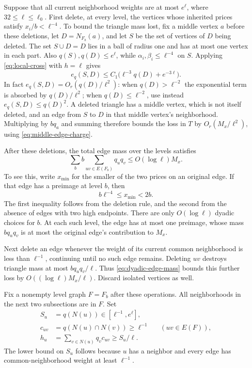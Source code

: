 Suppose that all current neighborhood weights are at most $e^\ell$, where
$32\le\ell\le\ell_0$.  First delete, at every level, the vertices whose
inherited prices satisfy $x_i/b<\ell^{-4}$.  To bound the triangle mass
lost, fix a middle vertex $a$ before these deletions, let
$D=N_{F_b}(a)$, and let $S$ be the set of vertices of $D$ being deleted.
The set $S\cup D=D$ lies in a ball of radius one and has at most one vertex
in each part.  Also $q(S),q(D)\le e^\ell$, while
$\alpha_i,\beta_i\le\ell^{-4}$ on $S$.  Applying
\eqref{eq:local-cross} with $h=\ell$ gives
\[
 e_q(S,D)\le C_1\bigl(\ell^{-3}q(D)+e^{-3\ell}\bigr).
\]
In fact $e_q(S,D)=O_r(q(D)/\ell^2)$: when $q(D)>\ell^{-2}$ the
exponential term is absorbed by $q(D)/\ell^2$; when
$q(D)\le\ell^{-2}$, use instead $e_q(S,D)\le q(D)^2$.
A deleted triangle has a middle vertex, which is
not itself deleted, and an edge from $S$ to $D$ in that middle vertex's
neighborhood.  Multiplying by $bq_a$ and summing therefore bounds the loss
in $T$ by $O_r(M_x/\ell^2)$, using
\eqref{eq:middle-edge-charge}.

After these deletions, the total edge mass over the levels satisfies
\begin{equation}
 \sum_b b\sum_{uv\in E(F_b)}q_uq_v
                  \le O(\log\ell)M_x.
 \label{eq:dyadic-edge-mass}
\end{equation}
To see this, write $x_{\min}$ for the smaller of the two prices on an
original edge.  If that edge has a preimage at level $b$, then
\[
 b\ell^{-4}\le x_{\min}<2b.
\]
The first inequality follows from the deletion rule, and the second from
the absence of edges with two high endpoints.  There are only
$O(\log\ell)$ dyadic choices for $b$.  At each such level, the edge has
at most one preimage, whose mass $bq_uq_v$ is at most the original edge's
contribution to $M_x$.

Next delete an edge whenever the weight of its current common
neighborhood is less than $\ell^{-1}$, continuing until no such edge
remains.  Deleting $uv$ destroys triangle mass at most
$bq_uq_v/\ell$.  Thus \eqref{eq:dyadic-edge-mass} bounds this further
loss by $O((\log\ell)M_x/\ell)$.  Discard isolated vertices as well.

Fix a nonempty level graph $F=F_b$ after these operations.  All
neighborhoods in the next two subsections are in $F$.  Set
\begin{equation}
 \begin{aligned}
 S_u&=q(N(u))\in[\ell^{-1},e^\ell],\\
 c_{uv}&=q(N(u)\cap N(v))\ge\ell^{-1}
                       &&(uv\in E(F)),\\
 h_u&=\sum_{v\in N(u)}q_vc_{uv}\ge S_u/\ell.
 \end{aligned}
 \label{eq:prepared-level}
\end{equation}
The lower bound on $S_u$ follows because $u$ has a neighbor and every edge
has common-neighborhood weight at least $\ell^{-1}$.

